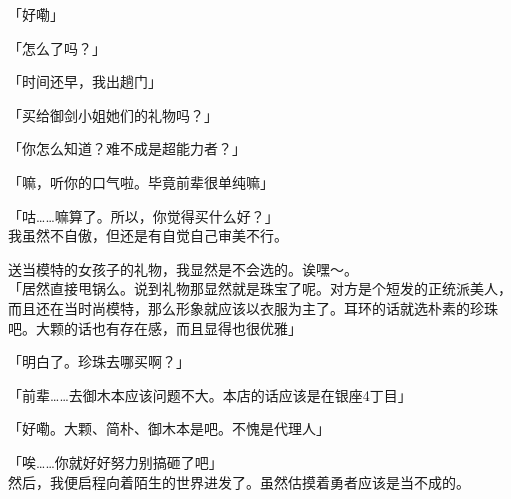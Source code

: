 「好嘞」

「怎么了吗？」

「时间还早，我出趟门」

「买给御剑小姐她们的礼物吗？」

「你怎么知道？难不成是超能力者？」

「嘛，听你的口气啦。毕竟前辈很单纯嘛」

「咕……嘛算了。所以，你觉得买什么好？」\\

我虽然不自傲，但还是有自觉自己审美不行。

送当模特的女孩子的礼物，我显然是不会选的。诶嘿～。\\

「居然直接甩锅么。说到礼物那显然就是珠宝了呢。对方是个短发的正统派美人，而且还在当时尚模特，那么形象就应该以衣服为主了。耳环的话就选朴素的珍珠吧。大颗的话也有存在感，而且显得也很优雅」

「明白了。珍珠去哪买啊？」

「前辈……去御木本应该问题不大。本店的话应该是在银座4丁目」

「好嘞。大颗、简朴、御木本是吧。不愧是代理人」

「唉……你就好好努力别搞砸了吧」\\

然后，我便启程向着陌生的世界进发了。虽然估摸着勇者应该是当不成的。\\
